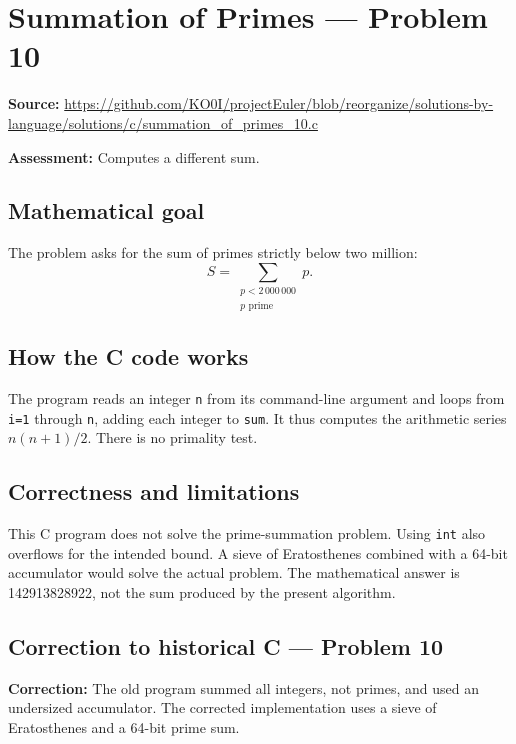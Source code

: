 \section{Summation of Primes --- Problem 10}
\label{prob:10}
\noindent\textbf{Source:} \url{https://github.com/KO0I/projectEuler/blob/reorganize/solutions-by-language/solutions/c/summation_of_primes_10.c}

\noindent\textbf{Assessment:} Computes a different sum.

\subsection*{Mathematical goal}
The problem asks for the sum of primes strictly below two million:
\[
S=\sum_{\substack{p<2\,000\,000\\p\text{ prime}}}p.
\]

\subsection*{How the C code works}
The program reads an integer \verb|n| from its command-line argument and loops from \verb|i=1| through \verb|n|, adding each integer to \verb|sum|. It thus computes the arithmetic series \(n(n+1)/2\). There is no primality test.

\subsection*{Correctness and limitations}
This C program does not solve the prime-summation problem. Using \verb|int| also overflows for the intended bound. A sieve of Eratosthenes combined with a 64-bit accumulator would solve the actual problem. The mathematical answer is 142913828922, not the sum produced by the present algorithm.


\subsection*{Correction to historical C --- Problem 10}
{\color{red}\textbf{Correction:} The old program summed all integers, not primes, and used an undersized accumulator. The corrected implementation uses a sieve of Eratosthenes and a 64-bit prime sum.}
